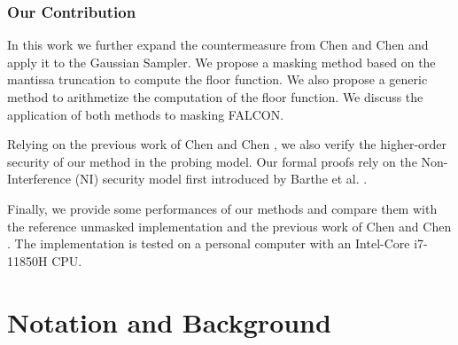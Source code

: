 \documentclass[runningheads]{llncs}
\begin{document}
\subsubsection{Our Contribution}
In this work we further expand the countermeasure from Chen and Chen \cite{Chen_Chen_2024} and apply it to the Gaussian Sampler. We propose a masking method based on the mantissa truncation to compute the floor function. We also propose a generic method to arithmetize the computation of the floor function. We discuss the application of both methods to masking FALCON.

\medskip

Relying on the previous work of Chen and Chen \cite{Chen_Chen_2024}, we also verify the higher-order security of our method in the probing model. Our formal proofs rely on the Non-Interference (NI) security model first introduced by Barthe et al. \cite{10.1145/2976749.2978427}.

\medskip

Finally, we provide some performances of our methods and compare them with the reference unmasked implementation and the previous work of Chen and Chen \cite{Chen_Chen_2024}. The implementation is tested on a personal computer with an Intel-Core i7-11850H CPU.
%
\section{Notation and Background}\label{sec:background}
\end{document}
